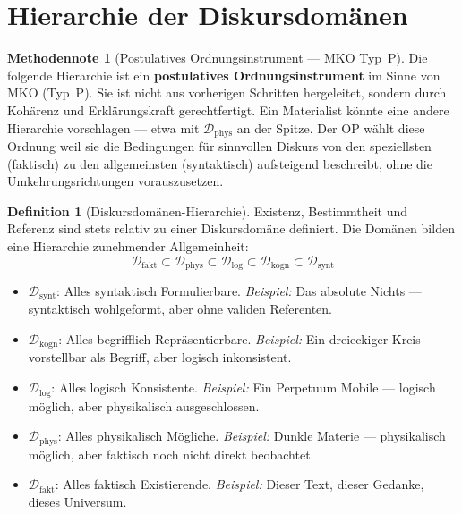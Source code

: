 \documentclass[11pt,a4paper]{article}
\theoremstyle{plain}
\theoremstyle{definition}
\newtheorem{definition}{Definition}[section]
\newtheorem{methodennote}{Methodennote}[section]
\begin{document}
\section{Hierarchie der Diskursdom\"{a}nen}

\begin{methodennote}[Postulatives Ordnungsinstrument --- MKO Typ~P]
Die folgende Hierarchie ist ein \textbf{postulatives Ordnungsinstrument} im Sinne
von MKO (Typ~P). Sie ist nicht aus vorherigen Schritten hergeleitet, sondern durch
Koh\"{a}renz und Erkl\"{a}rungskraft gerechtfertigt. Ein Materialist k\"{o}nnte eine
andere Hierarchie vorschlagen --- etwa mit $\mathcal{D}_{\mathrm{phys}}$ an der
Spitze. Der OP w\"{a}hlt diese Ordnung weil sie die Bedingungen f\"{u}r sinnvollen
Diskurs von den speziellsten (faktisch) zu den allgemeinsten (syntaktisch) aufsteigend
beschreibt, ohne die Umkehrungsrichtungen vorauszusetzen.
\end{methodennote}

\begin{definition}[Diskursdom\"{a}nen-Hierarchie]
Existenz, Bestimmtheit und Referenz sind stets relativ zu einer Diskursdom\"{a}ne
definiert. Die Dom\"{a}nen bilden eine Hierarchie zunehmender Allgemeinheit:
\[
  \mathcal{D}_{\mathrm{fakt}}
  \subset
  \mathcal{D}_{\mathrm{phys}}
  \subset
  \mathcal{D}_{\mathrm{log}}
  \subset
  \mathcal{D}_{\mathrm{kogn}}
  \subset
  \mathcal{D}_{\mathrm{synt}}
\]
\begin{itemize}
  \item $\mathcal{D}_{\mathrm{synt}}$: Alles syntaktisch Formulierbare.
        \textit{Beispiel:} \glqq{}Das absolute Nichts\grqq{} --- syntaktisch
        wohlgeformt, aber ohne validen Referenten.
  \item $\mathcal{D}_{\mathrm{kogn}}$: Alles begrifflich Repr\"{a}sentierbare.
        \textit{Beispiel:} Ein dreieckiger Kreis --- vorstellbar als Begriff,
        aber logisch inkonsistent.
  \item $\mathcal{D}_{\mathrm{log}}$: Alles logisch Konsistente.
        \textit{Beispiel:} Ein Perpetuum Mobile --- logisch m\"{o}glich, aber
        physikalisch ausgeschlossen.
  \item $\mathcal{D}_{\mathrm{phys}}$: Alles physikalisch M\"{o}gliche.
        \textit{Beispiel:} Dunkle Materie --- physikalisch m\"{o}glich, aber
        faktisch noch nicht direkt beobachtet.
  \item $\mathcal{D}_{\mathrm{fakt}}$: Alles faktisch Existierende.
        \textit{Beispiel:} Dieser Text, dieser Gedanke, dieses Universum.
\end{itemize}
\end{definition}
\end{document}
